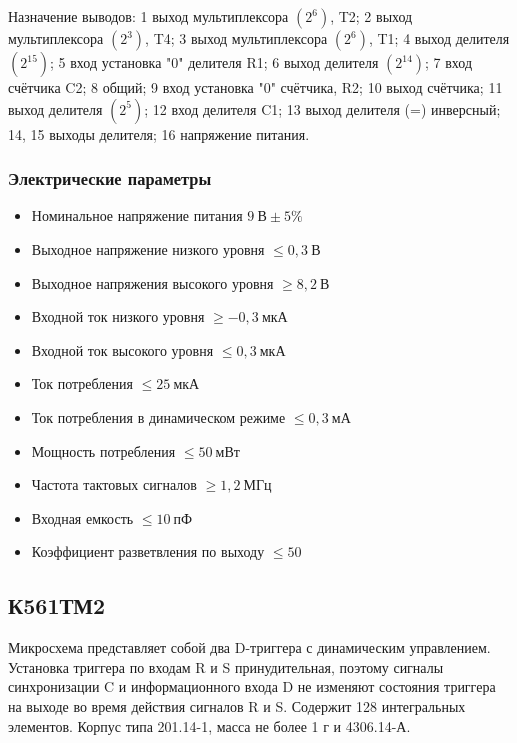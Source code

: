 Назначение выводов: 1 \longndash выход мультиплексора $(2^6)$, T2; 2 \longndash выход мультиплексора $(2^3)$, T4; 3 \longndash выход мультиплексора $(2^6)$, T1; 4 \longndash выход делителя $(2^{15})$; 5 \longndash вход установка "0" делителя R1; 6 \longndash выход делителя $(2^{14})$; 7 \longndash вход счётчика C2; 8 \longndash общий; 9 \longndash вход установка "0" счётчика, R2; 10 \longndash выход счётчика; 11 \longndash выход делителя $(2^5)$; 12 \longndash вход делителя C1; 13 \longndash выход делителя (=) инверсный; 14, 15 \longndash выходы делителя; 16 \longndash напряжение питания.

\subsubsection*{Электрические параметры}
\begin{itemize}
	\item[] Номинальное напряжение питания \dotfill $9~\text{В} \pm 5\%$
	\item[] Выходное напряжение низкого уровня \dotfill $\leq 0,3~\text{В}$
	\item[] Выходное напряжения высокого уровня \dotfill $\geq 8,2~\text{В}$
	\item[] Входной ток низкого уровня \dotfill $\geq -0,3~\text{мкА}$
	\item[] Входной ток высокого уровня \dotfill $\leq 0,3~\text{мкА}$
	\item[] Ток потребления \dotfill $\leq 25~\text{мкА}$
	\item[] Ток потребления в динамическом режиме \dotfill $\leq 0,3~\text{мА}$
	\item[] Мощность потребления \dotfill $\leq 50~\text{мВт}$
	\item[] Частота тактовых сигналов \dotfill $\geq 1,2~\text{МГц}$
	\item[] Входная емкость \dotfill $\leq 10~\text{пФ}$
	\item[] Коэффициент разветвления по выходу \dotfill $\leq 50$
\end{itemize}

\subsection*{К561ТМ2}

Микросхема представляет собой два D-триггера с динамическим управлением. Установка триггера по входам R и S принудительная, поэтому сигналы синхронизации C и информационного входа D не изменяют состояния триггера на выходе во время действия сигналов R и S. Содержит 128 интегральных элементов. Корпус типа 201.14-1, масса не более 1 г и 4306.14-А.

